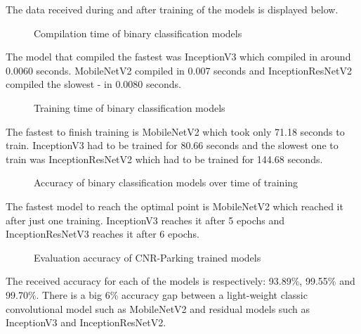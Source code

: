 \documentclass{ijisa}
\begin{document}
The data received during and after training of the models is displayed below.

\begin{figure}[!h]
\centering
\scalebox{0.5}{}
\caption{Compilation time of binary classification models} \label{fig:fig6}
\end{figure}

The model that compiled the fastest was InceptionV3 which compiled in around 0.0060 seconds. MobileNetV2 compiled in 0.007 seconds and InceptionResNetV2 compiled the slowest - in 0.0080 seconds.

\begin{figure}[!h]
\centering
\scalebox{0.5}{}
\caption{Training time of binary classification models} \label{fig:fig7}
\end{figure}

The fastest to finish training is MobileNetV2 which took only 71.18 seconds to train. InceptionV3 had to be trained for 80.66 seconds and the slowest one to train was InceptionResNetV2 which had to be trained for 144.68 seconds.

\begin{figure}[!h]
\centering
\scalebox{0.5}{}
\caption{Accuracy of binary classification models over time of training} \label{fig:fig8}
\end{figure}

The fastest model to reach the optimal point is MobileNetV2 which reached it after just one training. InceptionV3 reaches it after 5 epochs and InceptionResNetV3 reaches it after 6 epochs.

\begin{figure}[!h]
\centering
\scalebox{0.5}{}
\caption{Evaluation accuracy of CNR-Parking trained models} \label{fig:fig9}
\end{figure}

The received accuracy for each of the models is respectively: 93.89\%, 99.55\% and 99.70\%. There is a big 6\% accuracy gap between a light-weight classic convolutional model such as MobileNetV2 and residual models such as InceptionV3 and InceptionResNetV2.\\\\\\\\\\\\
\end{document}
